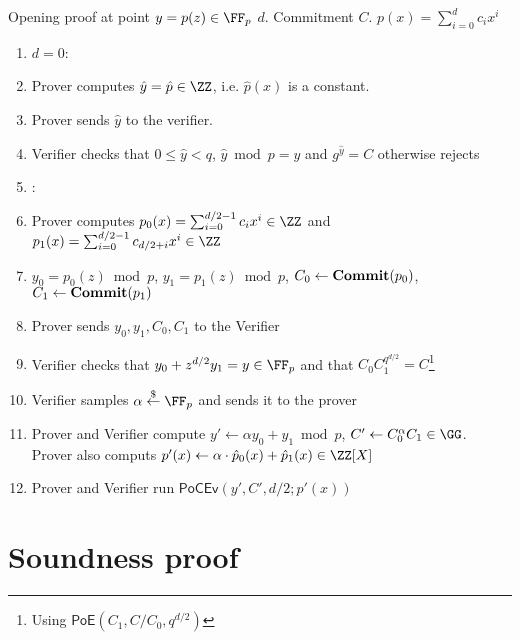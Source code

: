 \documentclass{article}
\begin{document}
\begin{small}
 \begin{minipage}{1.1\textwidth}
\begin{mdframed}[userdefinedwidth=1\textwidth]  \label{prot:Opening}

Opening proof at point $y=p(z)\in \FF_p$ $d$. Commitment $C$. $p(x)=\sum_{i=0}^{d} c_i x^{i}$
\begin{enumerate}[nolistsep]
\item \pcif $d=0$:
\item \pcind[1] Prover computes $\hat{y}=\hat{p} \in \ZZ$, i.e. $\hat{p}(x)$ is a constant. 
\item \pcind[1] Prover sends $\hat{y}$ to the verifier.
\item \pcind[1] Verifier checks that $0\leq\hat{y}< q$,  $\hat{y} \bmod p=y$ and $g^{\hat{y}}=C$ otherwise rejects
\item \pcelse:
\item \pcind[1] Prover computes $p_0(x)=\sum_{i=0}^{d/2-1} c_i x^i\in \ZZ$ and $p_1(x)=\sum_{i=0}^{d/2-1} c_{d/2+i} x^{i}\in \ZZ$
\item \pcind[1] $y_0=p_0(z) \bmod p$, $y_1=p_1(z)\bmod p$, $C_0\gets\textbf{{Commit}}(p_0)$,$C_1\gets\textbf{{Commit}}(p_1)$
\item \pcind[1] Prover sends $y_0,y_1,C_0,C_1$ to the Verifier
\item \pcind[1] Verifier checks that $y_0+z^{d/2} y_1=y\in \FF_p$ and that $C_0C_1^{q^{d/2}}=C$\footnote{Using $\textsf{PoE}(C_1,C/C_0,q^{d/2})$}
\item \pcind[1] Verifier samples $\alpha \sample \FF_p$ and sends it to the prover
\item \pcind[1] Prover and Verifier compute $y'\gets\alpha y_0 +y_1 \bmod p$, $C'\gets C_0^{\alpha}C_1 \in \GG$. \\Prover also computs $p'(x)\gets\alpha  \cdot \hat{p}_0(x)+\hat{p}_1(x) \in \ZZ[X]$ 
\item \pcind[1] Prover and Verifier run $\textsf{PoCEv}(y',C',d/2;p'(x))$
\end{enumerate}
\end{mdframed}
\end{minipage}
\end{small}

\section{Soundness proof}
\end{document}
